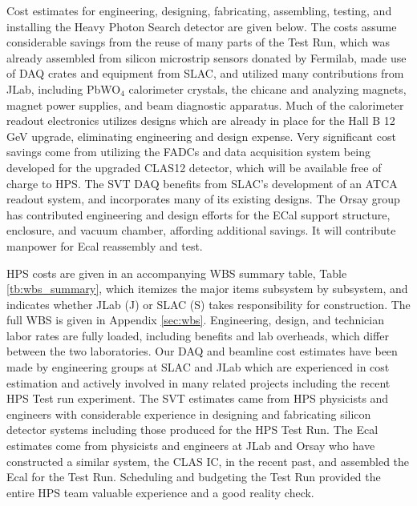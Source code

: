 \label{sec:schcost}

Cost estimates for engineering, designing, fabricating, assembling, testing, and installing the Heavy Photon Search detector 
are given below. The costs assume considerable savings from the reuse of many parts of the Test Run, which was already assembled 
from silicon microstrip sensors donated by Fermilab, made use of DAQ crates and equipment from SLAC,
and utilized many contributions from JLab, including PbWO$_4$ calorimeter crystals, the chicane and analyzing magnets, magnet power supplies,
and beam diagnostic apparatus. Much of the calorimeter readout electronics utilizes designs which are already in place for the Hall
B 12 GeV upgrade, eliminating engineering and design expense. Very significant cost savings come from utilizing the FADCs and data acquisition 
system being developed for the upgraded CLAS12 detector, which will be available free of charge to HPS. The SVT DAQ benefits from SLAC's 
development of an ATCA readout system, and incorporates many of its existing designs.  The Orsay group has
contributed engineering and design efforts for the ECal support structure, enclosure, and vacuum chamber, affording additional savings. It will
contribute manpower for Ecal reassembly and test.  

HPS costs are given in an accompanying WBS summary table, Table \ref{tb:wbs_summary}, which itemizes the major items subsystem by subsystem, and 
indicates whether JLab (J) or SLAC (S) takes responsibility for construction. 
The full WBS is given in Appendix \ref{sec:wbs}.
Engineering, design, and technician labor rates are fully loaded, 
including benefits and lab overheads, which differ between the two laboratories. Our 
DAQ and beamline cost estimates have been made by engineering groups at SLAC and JLab which are experienced in cost estimation and 
actively involved in many related projects including the recent HPS Test run experiment. The SVT estimates came from HPS physicists and engineers  with
considerable experience in designing and fabricating silicon detector systems including those produced for the HPS Test Run. 
The Ecal estimates come from physicists and engineers at 
JLab and Orsay who have constructed a similar system, the CLAS IC, in the recent past, and assembled the Ecal for the Test Run.
Scheduling and budgeting the Test Run provided the entire HPS team valuable experience and a good reality check. 


